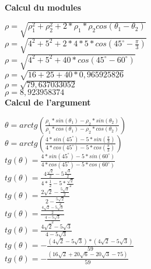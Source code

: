 \vspace{6mm}
\textbf{Calcul du modules}
\vspace{5mm}

$\rho = \sqrt{\rho_{1}^{2} + \rho_{2}^{2} + 2*\rho_{1}*\rho_{2} cos(\theta_{1} -  \theta_{2})}$ \\

$\rho = \sqrt{4^{2} + 5^{2} +2*4*5* cos(45^{\circ} - \frac{\pi}{3})}$ \\

$\rho = \sqrt{4^{2} + 5^{2} + 40* cos(45^{\circ} - 60^{\circ})}$ \\

$\rho = \sqrt{16 + 25 + 40* 0,965925826}$ \\

$\rho = \sqrt{79,637033052}$ \\

$\rho = 8,923958374$ \\

\vspace{4mm}
\textbf{Calcul de l'argument}
\vspace{5mm}

$\theta = arctg(\frac{\rho_{1}*sin(\theta_{1}) - \rho_{2}*sin(\theta_{2})}{\rho_{1}*cos(\theta_{1}) - \rho_{2}*cos(\theta_{2})})$ \\

$\theta = arctg(\frac{4*sin(45^{\circ}) - 5*sin(\frac{\pi}{3})}{4*cos(45^{\circ}) - 5*cos(\frac{\pi}{3})})$ \\

$tg(\theta) = \frac{4*sin(45^{\circ}) - 5*sin(60^{\circ})}{4*cos(45^{\circ}) - 5*cos(60^{\circ})}$ \\

$tg(\theta) = \frac{4\frac{\sqrt{2}}{2} - 5\frac{\sqrt{3}}{2} } {4*\frac{1}{2} - 5 * \frac{\sqrt{2}}{2}}$ \\

$tg(\theta) = \frac{2\sqrt{2} - \frac{5\sqrt{3}}{2} } {2 - \frac{5\sqrt{2}}{2} }$ \\

$tg(\theta) = \frac{\frac{4\sqrt{2} - 5\sqrt{3}}{2}} {\frac{4 - 5\sqrt{3}}{2} }$ \\

$tg(\theta) = \frac{4\sqrt{2} - 5\sqrt{3}} {4 - 5\sqrt{3} }$ \\

$tg(\theta) = - \frac{(4\sqrt{2} - 5\sqrt{3}) * (4\sqrt{2} - 5\sqrt{3})}{59}$ \\

$tg(\theta) = - \frac{(16\sqrt{2} + 20\sqrt{6} - 20\sqrt{3} - 75)} {59}$ \\

